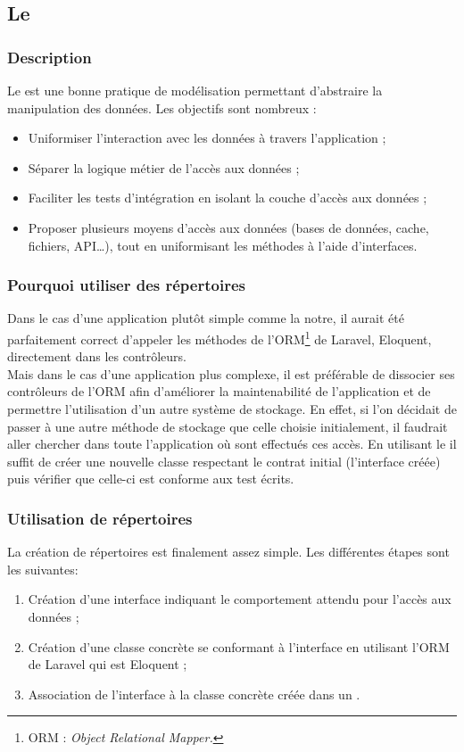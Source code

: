 	\subsection{Le \repositoryPattern}

		\subsubsection{Description}
			Le \repositoryPattern{} est une bonne pratique de modélisation permettant d'abstraire la manipulation des données. Les objectifs sont nombreux :
			\begin{itemize}
				\item Uniformiser l’interaction avec les données à travers l'application ;
				\item Séparer la logique métier de l'accès aux données ;
				\item Faciliter les tests d'intégration en isolant la couche d'accès aux données ;
				\item Proposer plusieurs moyens d'accès aux données (bases de données, cache, fichiers, API\dots), tout en uniformisant les méthodes à l'aide d'interfaces.
			\end{itemize}

		\subsubsection{Pourquoi utiliser des répertoires}
			Dans le cas d'une application plutôt simple comme la notre, il aurait été parfaitement correct d'appeler les méthodes de l'ORM\footnote{ORM : \textit{Object Relational Mapper.}} de Laravel, Eloquent, directement dans les contrôleurs.\\

			Mais dans le cas d'une application plus complexe, il est préférable de dissocier ses contrôleurs de l'ORM afin d'améliorer la maintenabilité de l'application et de permettre l'utilisation d'un autre système de stockage. En effet, si l'on décidait de passer à une autre méthode de stockage que celle choisie initialement, il faudrait aller chercher dans toute l'application où sont effectués ces accès. En utilisant le \repositoryPattern{} il suffit de créer une nouvelle classe respectant le contrat initial (l'interface créée) puis vérifier que celle-ci est conforme aux test écrits.

		\subsubsection{Utilisation de répertoires}
			La création de répertoires est finalement assez simple. Les différentes étapes sont les suivantes:
			\begin{enumerate}
				\item Création d'une interface indiquant le comportement attendu pour l'accès aux données ;
				\item Création d'une classe concrète se conformant à l'interface en utilisant l'ORM de Laravel qui est Eloquent ;
				\item Association de l'interface à la classe concrète créée dans un \serviceProvider.
			\end{enumerate}

